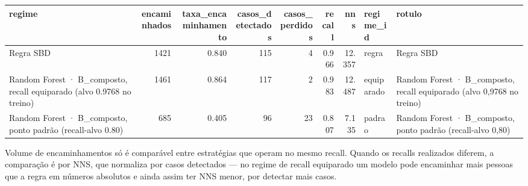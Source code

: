\begin{tabular}{lrrrrrrll}
\toprule
regime & encaminhados & taxa_encaminhamento & casos_detectados & casos_perdidos & recall & nns & regime_id & rotulo \\
\midrule
Regra SBD & 1421 & 0.840 & 115 & 4 & 0.966 & 12.357 & regra & Regra SBD \\
Random Forest · B_composto, recall equiparado (alvo 0.9768 no treino) & 1461 & 0.864 & 117 & 2 & 0.983 & 12.487 & equiparado & Random Forest · B_composto, recall equiparado (alvo 0,9768 no treino) \\
Random Forest · B_composto, ponto padrão (recall-alvo 0.80) & 685 & 0.405 & 96 & 23 & 0.807 & 7.135 & padrao & Random Forest · B_composto, ponto padrão (recall-alvo 0,80) \\
\bottomrule
\end{tabular}

\begin{flushleft}
\footnotesize Volume de encaminhamentos só é comparável entre estratégias que operam no mesmo recall. Quando os recalls realizados diferem, a comparação é por NNS, que normaliza por casos detectados — no regime de recall equiparado um modelo pode encaminhar mais pessoas que a regra em números absolutos e ainda assim ter NNS menor, por detectar mais casos.
\end{flushleft}
